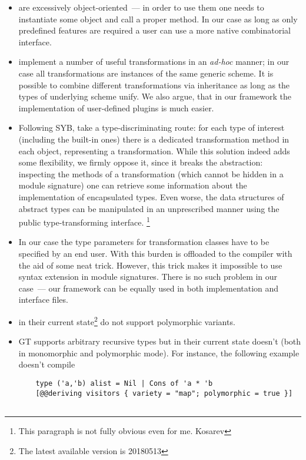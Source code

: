 \begin{itemize}
   \item {} are excessively object-oriented~--- in order to use them one needs to instantiate some object and call a proper method. In our case as long as
     only predefined features are required a user can use a more native combinatorial interface.
     
   \item {} implement a number of useful transformations in an \emph{ad-hoc} manner; in our case all transformations are instances of the
     same generic scheme. It is possible to combine different transformations via inheritance as long as the types of underlying scheme unify. We also argue, that
     in our framework the implementation of user-defined plugins is much easier.
     
   \item Following SYB,  take a type-discriminating route: for each type of interest (including the built-in ones) there is a dedicated
     transformation method in each object, representing a transformation. While this solution indeed adds some flexibility, we firmly oppose it, since it
     breaks the abstraction: inspecting the methods of a transformation (which cannot be hidden in a module signature) one can retrieve some
     information about the implementation of encapsulated types. Even worse, the data structures of abstract types can be manipulated in an unprescribed
     manner using the public type-transforming interface.
     \footnote{This paragraph is not fully obvious even for me. Kosarev}

   \item In our case the type parameters for transformation classes have to be specified by an end user. With  this burden is offloaded to the
     compiler with the aid of some neat trick. However, this trick makes it impossible to use  syntax extension in module signatures. There is no
     such problem in our case~--- our framework can be equally used in both implementation and interface files.

   \item {} in their current state\footnote{The latest available version is 20180513} do not support polymorphic variants.
   
   \item GT supports arbitrary recursive types but  in their current state doesn't (both in monomorphic and polymorphic mode). For instance, the following example doesn't compile 
   \begin{lstlisting}
    type ('a,'b) alist = Nil | Cons of 'a * 'b
    [@@deriving visitors { variety = "map"; polymorphic = true }]


\end{lstlisting}
\end{itemize}
